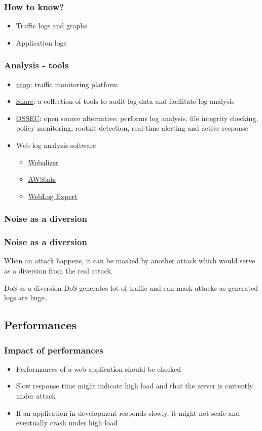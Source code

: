 \begin{frame}
\frametitle{How to know?}
\begin{itemize}
\item Traffic logs and graphs
\item Application logs
\end{itemize}
\end{frame}

\begin{frame}
\frametitle{Analysis - tools}
\begin{itemize}
\item \href{http://www.ntop.org/products/ntop/}{ntop}: traffic monitoring
platform
\item \href{http://www.intersectalliance.com}{Snare}: a collection of tools to
audit log data and facilitate log analysis
\item \href{http://www.ossec.net/}{OSSEC}: open source alternative; performs
log analysis, file integrity checking, policy monitoring, rootkit detection,
real-time alerting and active response
\item Web log analysis software
	\begin{itemize}
	\item \href{http://www.webalizer.org/}{Webalizer}
	\item \href{http://awstats.sourceforge.net/}{AWStats}
	\item \href{http://www.weblogexpert.com/}{WebLog Expert}
	\end{itemize}
\end{itemize}
\end{frame}

\subsubsection{Noise as a diversion}

\begin{frame}
\frametitle{Noise as a diversion}
When an attack happens, it can be masked by another attack which would serve
as a diversion from the real attack.
\begin{exampleblock}{DoS as a diversion}
DoS generates lot of traffic and can mask attacks as generated logs are huge.
\end{exampleblock}
\end{frame}

\subsection{Performances}

\begin{frame}
\frametitle{Impact of performances}
\begin{itemize}
\item Performances of a web application should be checked
\item Slow response time might indicate high load and that the server is
currently under attack
\item If an application in development responds slowly, it might not scale and
eventually crash under high load
\end{itemize}
\end{frame}

